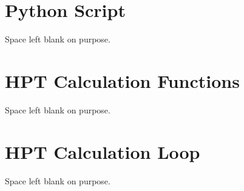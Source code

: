 \documentclass[12pt, letter]{report}
\begin{document}
\chapter{Python Script} \label{sec:app_output}
Space left blank on purpose.



\chapter{HPT Calculation Functions}
Space left blank on purpose.


\chapter{HPT Calculation Loop}
Space left blank on purpose.

\end{document}
